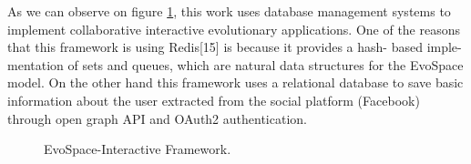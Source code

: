 As we can observe on figure \ref{fig:ESFramework}, this work uses database management systems to
implement collaborative interactive evolutionary applications. One of the
reasons that this framework is using Redis[15] is because it provides a hash-
based imple-mentation of sets and queues, which are natural data structures for
the EvoSpace model. On the other hand this framework uses a relational database
to save basic information about the user extracted from the social platform
(Facebook) through open graph API and OAuth2 authentication.

\begin{figure}
\captionsetup{justification=centering,margin=2cm}
\centering
\setlength\fboxsep{0pt}
\setlength\fboxrule{0.7pt}
\caption{EvoSpace-Interactive Framework.}
\label{fig:ESFramework}       
\end{figure}
